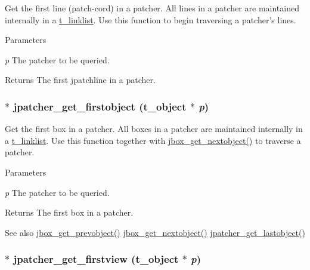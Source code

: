 Get the first line (patch-\/cord) in a patcher. All lines in a patcher are maintained internally in a \hyperlink{structt__linklist}{t\_\-linklist}. Use this function to begin traversing a patcher's lines.


\begin{DoxyParams}{Parameters}
\item[{\em p}]The patcher to be queried. \end{DoxyParams}
\begin{DoxyReturn}{Returns}
The first jpatchline in a patcher. 
\end{DoxyReturn}
\hypertarget{group__jpatcher_gafd77f63d504807973a4ce400c304b174}{
\subsubsection[{jpatcher\_\-get\_\-firstobject}]{$\ast$ jpatcher\_\-get\_\-firstobject ({\bf t\_\-object} $\ast$ {\em p})}}
\label{group__jpatcher_gafd77f63d504807973a4ce400c304b174}


Get the first box in a patcher. All boxes in a patcher are maintained internally in a \hyperlink{structt__linklist}{t\_\-linklist}. Use this function together with \hyperlink{group__jbox_ga89177ab12d45649c7209e65c97a3b128}{jbox\_\-get\_\-nextobject()} to traverse a patcher.


\begin{DoxyParams}{Parameters}
\item[{\em p}]The patcher to be queried. \end{DoxyParams}
\begin{DoxyReturn}{Returns}
The first box in a patcher. 
\end{DoxyReturn}
\begin{DoxySeeAlso}{See also}
\hyperlink{group__jbox_ga99be7a7b57c38335d30e6241afb86a5b}{jbox\_\-get\_\-prevobject()} \hyperlink{group__jbox_ga89177ab12d45649c7209e65c97a3b128}{jbox\_\-get\_\-nextobject()} \hyperlink{group__jpatcher_gaffb5e8d5224f7aa04cdbee76a041bab7}{jpatcher\_\-get\_\-lastobject()} 
\end{DoxySeeAlso}
\hypertarget{group__jpatcher_gaccc0cfeb70fbeecbd322de7e8b9bac98}{
\subsubsection[{jpatcher\_\-get\_\-firstview}]{$\ast$ jpatcher\_\-get\_\-firstview ({\bf t\_\-object} $\ast$ {\em p})}}
\label{group__jpatcher_gaccc0cfeb70fbeecbd322de7e8b9bac98}


